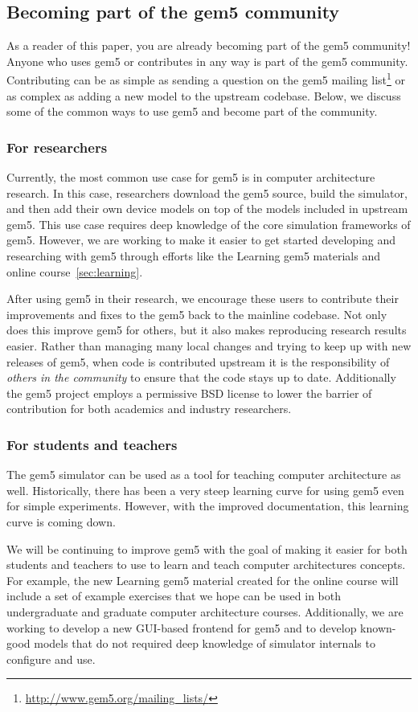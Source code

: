 \subsection{Becoming part of the gem5 community}

As a reader of this paper, you are already becoming part of the gem5 community!
Anyone who uses gem5 or contributes in any way is part of the gem5 community.
Contributing can be as simple as sending a question on the gem5 mailing list\footnote{\url{http://www.gem5.org/mailing_lists/}} or as complex as adding a new model to the upstream codebase.
Below, we discuss some of the common ways to use gem5 and become part of the community.

\subsubsection{For researchers}

Currently, the most common use case for gem5 is in computer architecture research.
In this case, researchers download the gem5 source, build the simulator, and then add their own device models on top of the models included in upstream gem5.
This use case requires deep knowledge of the core simulation frameworks of gem5.
However, we are working to make it easier to get started developing and researching with gem5 through efforts like the Learning gem5 materials and online course~\ref{sec:learning}.

After using gem5 in their research, we encourage these users to contribute their improvements and fixes to the gem5 back to the mainline codebase.
Not only does this improve gem5 for others, but it also makes reproducing research results easier.
Rather than managing many local changes and trying to keep up with new releases of gem5, when code is contributed upstream it is the responsibility of \emph{others in the community} to ensure that the code stays up to date.
Additionally the gem5 project employs a permissive BSD license to lower the barrier of contribution for both academics and industry researchers.

\subsubsection{For students and teachers}

The gem5 simulator can be used as a tool for teaching computer architecture as well.
Historically, there has been a very steep learning curve for using gem5 even for simple experiments.
However, with the improved documentation, this learning curve is coming down.

We will be continuing to improve gem5 with the goal of making it easier for both students and teachers to use to learn and teach computer architectures concepts.
For example, the new Learning gem5 material created for the online course will include a set of example exercises that we hope can be used in both undergraduate and graduate computer architecture courses.
Additionally, we are working to develop a new GUI-based frontend for gem5 and to develop known-good models that do not required deep knowledge of simulator internals to configure and use.
